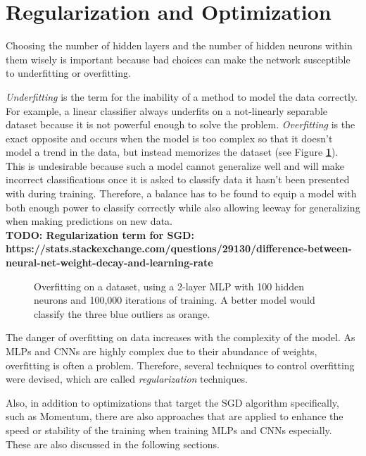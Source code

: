	\section {Regularization and Optimization}
\label{sec:reg_opt}

Choosing the number of hidden layers and the number of hidden neurons within them wisely is important because bad choices can make the network susceptible to underfitting or overfitting.

\textit{Underfitting} is the term for the inability of a method to model the data correctly. For example, a linear classifier always underfits on a not-linearly separable dataset because it is not powerful enough to solve the problem. \textit{Overfitting} is the exact opposite and occurs when the model is too complex so that it doesn't model a trend in the data, but instead memorizes the dataset (see Figure \textbf{\ref{fig:overfit}}). This is undesirable because such a model cannot generalize well and will make incorrect classifications once it is asked to classify data it hasn't been presented with during training. Therefore, a balance has to be found to equip a model with both enough power to classify correctly while also allowing leeway for generalizing when making predictions on new data.\\

\textbf{TODO: Regularization term for SGD: https://stats.stackexchange.com/questions/29130/difference-between-neural-net-weight-decay-and-learning-rate}\\

	\begin {figure}[!ht]
		\begin{center}
			\scalebox{0.75}{}
		\end{center}
		\caption[Overfitting on a dataset.]{Overfitting on a dataset, using a 2-layer MLP with 100 hidden neurons and 100,000 iterations of training. A better model would classify the three blue outliers as orange.}
		\label{fig:overfit}
	\end {figure}

\noindent The danger of overfitting on data increases with the complexity of the model. As MLPs and CNNs are highly complex due to their abundance of weights, overfitting is often a problem. Therefore, several techniques to control overfitting were devised, which are called \textit{regularization} techniques.

Also, in addition to optimizations that target the SGD algorithm specifically, such as Momentum, there are also approaches that are applied to enhance the speed or stability of the training when training MLPs and CNNs especially. These are also discussed in the following sections.

